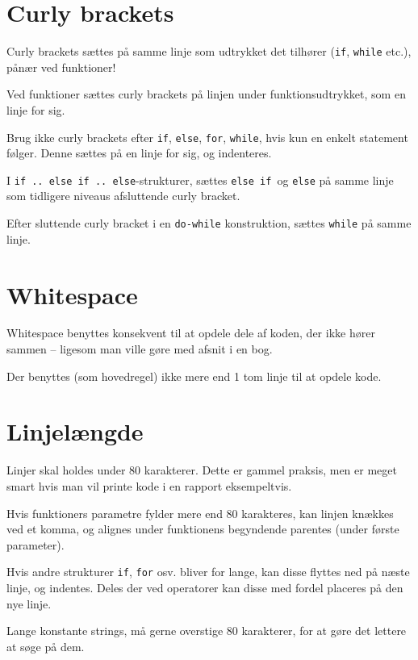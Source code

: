 \documentclass[article, 10pt]{memoir}
\let\tempone\itemize
\let\temptwo\enditemize
\renewenvironment{itemize}{\tempone\firmlist}{\temptwo}
\begin{document}
\begin{multicols}{2}
    \section{Curly brackets}
    \begin{itemize}
    \item Curly brackets sættes på samme linje som udtrykket det tilhører (\texttt{if}, \texttt{while} etc.), pånær ved funktioner!
    \item Ved funktioner sættes curly brackets på linjen under funktionsudtrykket, som en linje for sig.
    \item Brug ikke curly brackets efter \texttt{if}, \texttt{else}, \texttt{for}, \texttt{while}, hvis kun en enkelt statement følger. Denne sættes på en linje for sig, og indenteres.
    \item I \texttt{if .. else if .. else}-strukturer, sættes \texttt{else if }og \texttt{else} på samme linje som tidligere niveaus afsluttende curly bracket.
    \item Efter sluttende curly bracket i en \texttt{do-while} konstruktion, sættes \texttt{while} på samme linje.
    \end{itemize}

    \section{Whitespace}
    \begin{itemize}
    \item Whitespace benyttes konsekvent til at opdele dele af koden, der ikke hører sammen -- ligesom man ville gøre med afsnit i en bog.
    \item Der benyttes (som hovedregel) ikke mere end 1 tom linje til at opdele kode.
    \end{itemize}

    \section{Linjelængde}
    \begin{itemize}
    \item Linjer skal holdes under 80 karakterer. Dette er gammel praksis, men er meget smart hvis man vil printe kode i en rapport eksempeltvis.
    \item Hvis funktioners parametre fylder mere end 80 karakteres, kan linjen knækkes ved et komma, og alignes under funktionens begyndende parentes (under første parameter).
    \item Hvis andre strukturer \texttt{if}, \texttt{for} osv. bliver for lange, kan disse flyttes ned på næste linje, og indentes. Deles der ved operatorer kan disse med fordel placeres på den nye linje.
    \item Lange konstante strings, må gerne overstige 80 karakterer, for at gøre det lettere at søge på dem.
    \end{itemize}


\end{multicols}
\end{document}
